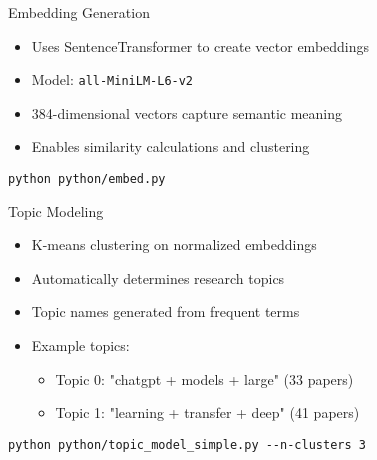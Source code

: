\documentclass{beamer}
\begin{document}
\begin{frame}{Embedding Generation}
    \begin{itemize}
        \item Uses SentenceTransformer to create vector embeddings
        \item Model: \texttt{all-MiniLM-L6-v2}
        \item 384-dimensional vectors capture semantic meaning
        \item Enables similarity calculations and clustering
    \end{itemize}
    
    \begin{lstlisting}[basicstyle=\tiny\ttfamily]
    python python/embed.py
    \end{lstlisting}
\end{frame}

\begin{frame}{Topic Modeling}
    \begin{itemize}
        \item K-means clustering on normalized embeddings
        \item Automatically determines research topics
        \item Topic names generated from frequent terms
        \item Example topics:
        \begin{itemize}
            \item Topic 0: "chatgpt + models + large" (33 papers)
            \item Topic 1: "learning + transfer + deep" (41 papers)
        \end{itemize}
    \end{itemize}
    
    \begin{lstlisting}[basicstyle=\tiny\ttfamily]
    python python/topic_model_simple.py --n-clusters 3
    \end{lstlisting}
\end{frame}
\end{document}
